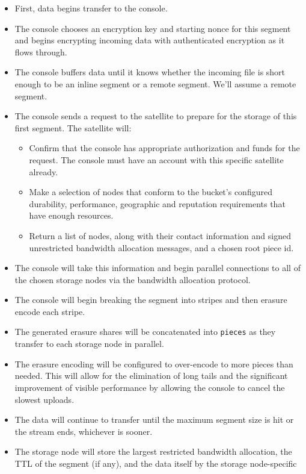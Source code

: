\documentclass[a4paper,10pt]{article} \usepackage[utf8]{inputenc}
\newcommand{\x}[1]{{\tt #1}} \newcommand{\code}[1]{{\tt #1}}
\begin{document}
\begin{itemize}
\item First, data begins transfer to the console.
\item The console chooses an encryption key and starting nonce for
  this segment and begins encrypting incoming data with authenticated
  encryption as it flows through.
\item The console buffers data until it knows whether the incoming file is
short enough to be an inline segment or a remote segment. We'll assume a remote
segment.
\item The console sends a request to the satellite to prepare for the storage
of this first segment. The satellite will:
  \begin{itemize}
  \item Confirm that the console has appropriate authorization and funds for
    the request. The console must have an account with this
specific satellite already.
  \item Make a selection of nodes that conform to the bucket's configured
    durability, performance, geographic and reputation requirements that have
    enough resources.
  \item Return a list of nodes, along with their contact information and
    signed unrestricted bandwidth allocation messages, and a chosen root piece
    id.
  \end{itemize}
\item The console will take this information and begin parallel connections to
  all of the chosen storage nodes via the bandwidth allocation protocol.
\item The console will begin breaking the segment into stripes and then
  erasure encode each stripe.
\item The generated erasure shares will be concatenated into \x{pieces} as they
  transfer to each storage node in parallel.
\item The erasure encoding will be configured to over-encode to more pieces
  than needed. This will allow for the elimination of long tails and the
  significant improvement of visible performance by allowing the console to
  cancel the slowest uploads.
\item The data will continue to transfer until the maximum segment size is hit
  or the stream ends, whichever is sooner.
\item The storage node will store the largest restricted bandwidth allocation,
the
  TTL of the segment (if any), and the data itself by the storage node-specific

\end{itemize}
\end{document}
